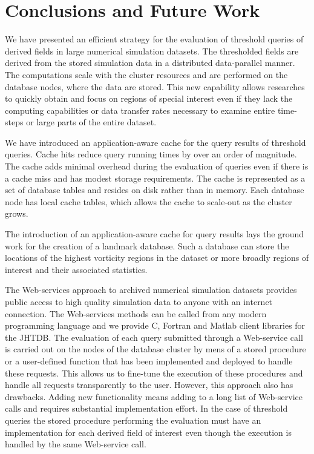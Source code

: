 \documentclass{sig-alternate}
\begin{document}
\section{Conclusions and Future Work}

We have presented an efficient strategy for the evaluation of threshold queries of derived fields in large numerical simulation datasets. 
The thresholded fields are derived from the stored simulation data in a distributed data-parallel manner. The computations
scale with the cluster resources and are performed on the database nodes, where the data are stored. This new capability allows researches to quickly
obtain and focus on regions of special interest even if they lack the computing capabilities or data transfer rates necessary to examine entire time-steps
or large parts of the entire dataset. 

We have introduced an application-aware cache for the query results of threshold queries. Cache hits reduce query running times by over an order of
magnitude. The cache adds minimal overhead during the evaluation of queries even if there is
a cache miss and has modest storage requirements. The cache is represented as a set of database tables and resides on disk rather than in memory. 
Each database node has local cache tables, which allows the cache to scale-out as the cluster grows.

The introduction of an application-aware cache for query results lays the ground work for the creation of a landmark database. Such a database can store the 
locations of the highest vorticity regions in the dataset or more broadly regions of interest and their associated statistics.

The Web-services approach to archived numerical simulation datasets provides public access to high quality simulation data to anyone with an internet
connection. The Web-services methods can be called from any modern programming language and we provide C, Fortran and Matlab client libraries for the
JHTDB. The evaluation of each query submitted through a Web-service call is carried out on the nodes of the database cluster by mens of a stored procedure
or a user-defined function that has been implemented and deployed to handle these requests. This allows us to fine-tune the execution of these procedures
and handle all requests transparently to the user. However, this approach also has drawbacks. Adding new functionality means adding to a long list of 
Web-service calls and requires substantial implementation effort. In the case of threshold queries the stored procedure performing the evaluation must have
an implementation for each derived field of interest even though the execution is handled by the same Web-service call. 
\end{document}

